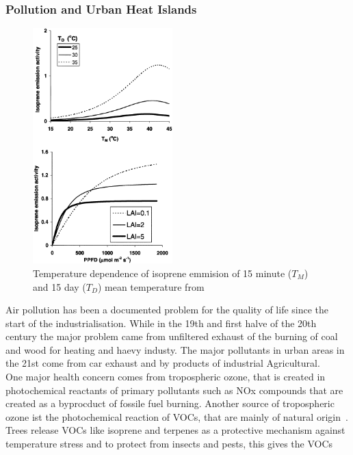 \documentclass[12pt,a4paper, english]{article}
\begin{document}
\subsubsection{Pollution and Urban Heat Islands}
\begin{figure}
  \begin{center}
    \includegraphics[width=0.48\textwidth]{img/VOCsGraphs}
  \end{center}
  \caption{Temperature dependence of isoprene emmision of 15 minute ($T_M$) and 15 day ($T_D$) mean temperature from \cite{Guenther2000}}\label{fig:tempVOC}
\end{figure}
Air pollution has been a documented problem for the quality of life since the start of the industrialisation. 
While in the 19th and first halve of the 20th century the major problem came from unfiltered exhaust of the burning of coal and wood for heating and haevy industy.
The major pollutants in urban areas in the 21st come from car exhaust and by products of industrial Agricultural. %
\\
One major health concern comes from tropospheric ozone, that is created in photochemical reactants of primary pollutants such as NOx compounds that are created as a byprocduct of fossile fuel burning. 
Another source of tropospheric ozone ist the photochemical reaction of \glspl{VOC}, that are mainly of natural origin~\cite{Kansal2009}.
Trees release VOCs like isoprene and terpenes as a protective mechanism against temperature stress and to protect from insects and pests, this gives the \glspl{VOC}
\end{document}
